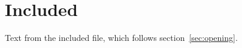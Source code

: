 \section{Included}\label{sec:included}
Text from the included file, which follows section~\ref{sec:opening}.
